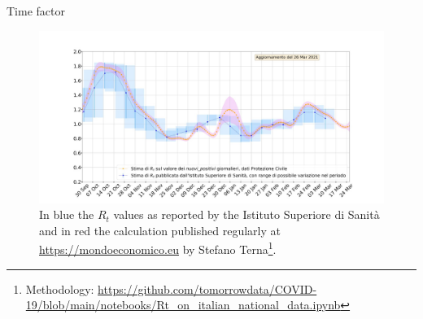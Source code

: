 \documentclass[8pt]{beamer}
\begin{document}
\begin{frame}{Time factor}

\begin{figure}[H]
\center
\includegraphics[scale=0.19]{RtEstimation.jpg}
\caption{In blue the $R_t$ values as reported by the Istituto Superiore di Sanit\`{a} and in red the calculation published regularly at \url{https://mondoeconomico.eu} by Stefano Terna\footnote{Methodology: \url{https://github.com/tomorrowdata/COVID-19/blob/main/notebooks/Rt_on_italian_national_data.ipynb}}.}
\label{Rt}
\end{figure}


\end{frame}
\end{document}
